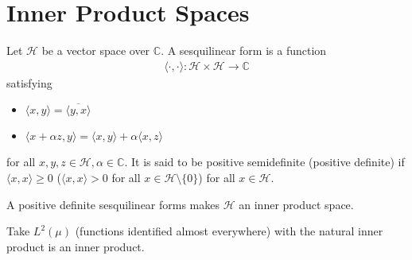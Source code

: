 
\chapter{Inner Product Spaces}

\begin{definition}
  Let $\mathcal{H}$ be a vector space over $\mathbb{C}$. A
  sesquilinear form is a function
  \begin{align*}
    \langle \cdot , \cdot \rangle : \mathcal{H} \times \mathcal{H}
    \to \mathbb{C}
  \end{align*}
  satisfying
  \begin{itemize}[]
    \item $\langle  x , y \rangle  = \overline{\langle y , x \rangle }$
    \item $\langle  x + \alpha z , y \rangle  = \langle x , y \rangle
      + \alpha \langle x , z \rangle $
  \end{itemize}
  for all $x, y, z \in \mathcal{H}, \alpha \in \mathbb{C}$.
  It is said to be positive semidefinite (positive definite) if $
  \langle x , x \rangle
  \ge 0$ ($\langle  x , x \rangle > 0$ for all $x \in
  \mathcal{H}\setminus \{0\}$) for all $x \in \mathcal{H}$.

  A positive definite sesquilinear forms makes $\mathcal{H}$ an inner
  product space.
\end{definition}

\begin{example}
  Take $L^2(\mu)$ (functions identified almost everywhere) with the
  natural inner product is an inner product.
\end{example}

